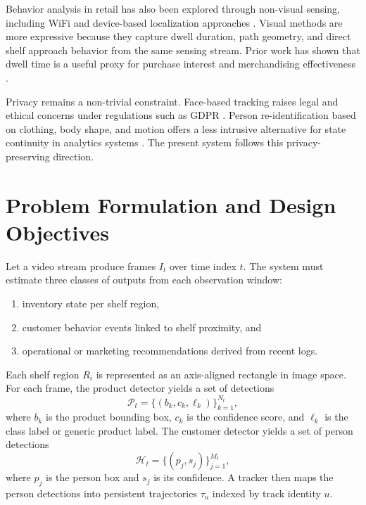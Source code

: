 \documentclass[conference]{IEEEtran}
\begin{document}
Behavior analysis in retail has also been explored through non-visual sensing, including WiFi and device-based localization approaches \cite{sen2013you}. Visual methods are more expressive because they capture dwell duration, path geometry, and direct shelf approach behavior from the same sensing stream. Prior work has shown that dwell time is a useful proxy for purchase interest and merchandising effectiveness \cite{hui2009effects}.

Privacy remains a non-trivial constraint. Face-based tracking raises legal and ethical concerns under regulations such as GDPR \cite{voigt2017gdpr}. Person re-identification based on clothing, body shape, and motion offers a less intrusive alternative for state continuity in analytics systems \cite{zheng2016person}. The present system follows this privacy-preserving direction.

\section{Problem Formulation and Design Objectives}

Let a video stream produce frames $I_t$ over time index $t$. The system must estimate three classes of outputs from each observation window:

\begin{enumerate}
    \item inventory state per shelf region,
    \item customer behavior events linked to shelf proximity, and
    \item operational or marketing recommendations derived from recent logs.
\end{enumerate}

Each shelf region $R_i$ is represented as an axis-aligned rectangle in image space. For each frame, the product detector yields a set of detections
\begin{equation}
\mathcal{P}_t = \{(b_k, c_k, \ell_k)\}_{k=1}^{N_t},
\end{equation}
where $b_k$ is the product bounding box, $c_k$ is the confidence score, and $\ell_k$ is the class label or generic product label. The customer detector yields a set of person detections
\begin{equation}
\mathcal{H}_t = \{(p_j, s_j)\}_{j=1}^{M_t},
\end{equation}
where $p_j$ is the person box and $s_j$ is its confidence. A tracker then maps the person detections into persistent trajectories $\tau_u$ indexed by track identity $u$.
\end{document}
